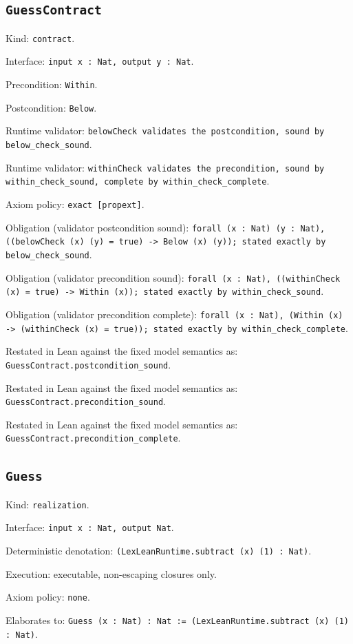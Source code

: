 \documentclass[11pt]{article}
\begin{document}
\subsection*{\texttt{GuessContract}}
\noindent Kind: \texttt{contract}.\par
\noindent Interface: \texttt{input x : Nat, output y : Nat}.\par
\noindent Precondition: \texttt{Within}.\par
\noindent Postcondition: \texttt{Below}.\par
\noindent Runtime validator: \texttt{belowCheck validates the postcondition, sound by below\_check\_sound}.\par
\noindent Runtime validator: \texttt{withinCheck validates the precondition, sound by within\_check\_sound, complete by within\_check\_complete}.\par
\noindent Axiom policy: \texttt{exact [propext]}.\par
\noindent Obligation (validator postcondition sound): \texttt{forall (x : Nat) (y : Nat), ((belowCheck (x) (y) = true) -> Below (x) (y)); stated exactly by below\_check\_sound}.\par
\noindent Obligation (validator precondition sound): \texttt{forall (x : Nat), ((withinCheck (x) = true) -> Within (x)); stated exactly by within\_check\_sound}.\par
\noindent Obligation (validator precondition complete): \texttt{forall (x : Nat), (Within (x) -> (withinCheck (x) = true)); stated exactly by within\_check\_complete}.\par
\noindent Restated in Lean against the fixed model semantics as: \texttt{GuessContract.postcondition\_sound}.\par
\noindent Restated in Lean against the fixed model semantics as: \texttt{GuessContract.precondition\_sound}.\par
\noindent Restated in Lean against the fixed model semantics as: \texttt{GuessContract.precondition\_complete}.\par
\subsection*{\texttt{Guess}}
\noindent Kind: \texttt{realization}.\par
\noindent Interface: \texttt{input x : Nat, output Nat}.\par
\noindent Deterministic denotation: \texttt{(LexLeanRuntime.subtract (x) (1) : Nat)}.\par
\noindent Execution: executable, non-escaping closures only.\par
\noindent Axiom policy: \texttt{none}.\par
\noindent Elaborates to: \texttt{Guess (x : Nat) : Nat := (LexLeanRuntime.subtract (x) (1) : Nat)}.\par
\end{document}
